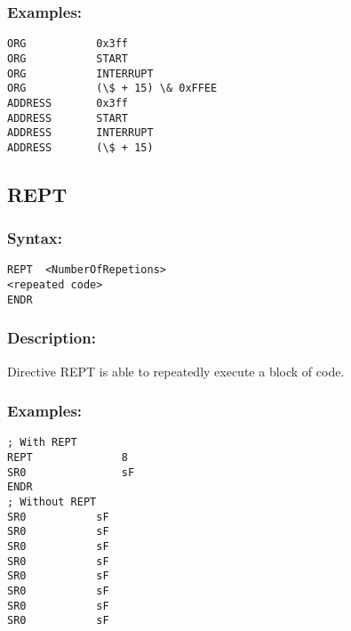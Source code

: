         \subsubsection{Examples:}
            {
                \usecodefont
                \verb'ORG           0x3ff'\\
                \verb'ORG           START'\\
                \verb'ORG           INTERRUPT'\\
                \verb'ORG           (\$ + 15) \& 0xFFEE'\\
                \verb'ADDRESS       0x3ff'\\
                \verb'ADDRESS       START'\\
                \verb'ADDRESS       INTERRUPT'\\
                \verb'ADDRESS       (\$ + 15)'\\
            }

    \subsection{REPT}
        \subsubsection{Syntax:}
            {
                \usecodefont
                \verb'REPT  <NumberOfRepetions>'\\
                \verb'<repeated code>'\\
                \verb'ENDR'
            }

        \subsubsection{Description:}
            Directive REPT is able to repeatedly execute a block of code.

        \subsubsection{Examples:}
            {
                \usecodefont
                \verb'; With REPT'\\
                \verb'REPT              8'\\
                \verb'SR0               sF'\\
                \verb'ENDR'\\
                \verb'; Without REPT'\\
                \verb'SR0           sF'\\
                \verb'SR0           sF'\\
                \verb'SR0           sF'\\
                \verb'SR0           sF'\\
                \verb'SR0           sF'\\
                \verb'SR0           sF'\\
                \verb'SR0           sF'\\
                \verb'SR0           sF'\\
            }

